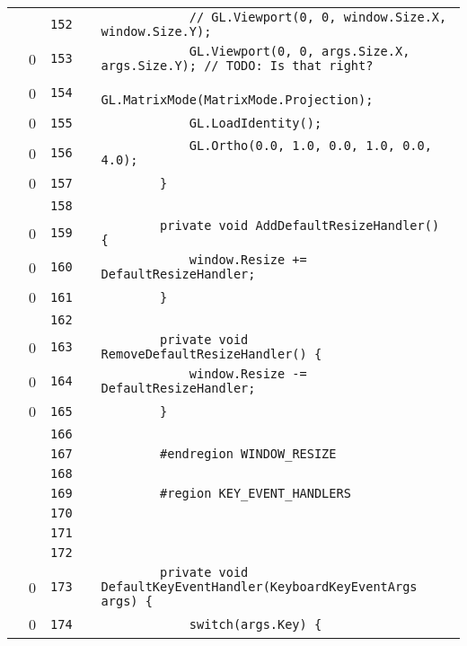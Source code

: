 \documentclass[a4paper,landscape,10pt]{article}
\begin{document}
\begin{longtable}[l]{lrrll}
\cellcolor{gray} &  & \verb~152~ & & \verb~            // GL.Viewport(0, 0, window.Size.X, window.Size.Y);~\\
\cellcolor{red} & 0 & \verb~153~ & & \verb~            GL.Viewport(0, 0, args.Size.X, args.Size.Y); // TODO: Is that right?~\\
\cellcolor{red} & 0 & \verb~154~ & & \verb~            GL.MatrixMode(MatrixMode.Projection);~\\
\cellcolor{red} & 0 & \verb~155~ & & \verb~            GL.LoadIdentity();~\\
\cellcolor{red} & 0 & \verb~156~ & & \verb~            GL.Ortho(0.0, 1.0, 0.0, 1.0, 0.0, 4.0);~\\
\cellcolor{red} & 0 & \verb~157~ & & \verb~        }~\\
\cellcolor{gray} &  & \verb~158~ & & \verb~~\\
\cellcolor{red} & 0 & \verb~159~ & & \verb~        private void AddDefaultResizeHandler() {~\\
\cellcolor{red} & 0 & \verb~160~ & & \verb~            window.Resize += DefaultResizeHandler;~\\
\cellcolor{red} & 0 & \verb~161~ & & \verb~        }~\\
\cellcolor{gray} &  & \verb~162~ & & \verb~~\\
\cellcolor{red} & 0 & \verb~163~ & & \verb~        private void RemoveDefaultResizeHandler() {~\\
\cellcolor{red} & 0 & \verb~164~ & & \verb~            window.Resize -= DefaultResizeHandler;~\\
\cellcolor{red} & 0 & \verb~165~ & & \verb~        }~\\
\cellcolor{gray} &  & \verb~166~ & & \verb~~\\
\cellcolor{gray} &  & \verb~167~ & & \verb~        #endregion WINDOW_RESIZE~\\
\cellcolor{gray} &  & \verb~168~ & & \verb~~\\
\cellcolor{gray} &  & \verb~169~ & & \verb~        #region KEY_EVENT_HANDLERS~\\
\cellcolor{gray} &  & \verb~170~ & & \verb~~\\
\cellcolor{gray} &  & \verb~171~ & & \verb~~\\
\cellcolor{gray} &  & \verb~172~ & & \verb~~\\
\cellcolor{red} & 0 & \verb~173~ & & \verb~        private void DefaultKeyEventHandler(KeyboardKeyEventArgs args) {~\\
\cellcolor{red} & 0 & \verb~174~ & & \verb~            switch(args.Key) {~\\

\end{longtable}
\end{document}
